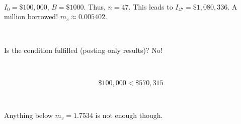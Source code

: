 \documentclass{article}
\begin{document}
\

$I_0 = \$100,000$, $B = \$1000$. Thus, $n = 47$. This leads to $I_{47} = \$1,080,336$. A million borrowed! $m_s \approx 0.005402$.

\

Is the condition fulfilled (posting only results)? No!

\

\begin{equation}
\$100,000 < \$570,315
\end{equation}

\

Anything below $m_v = 1.7534$ is not enough though.
\end{document}
